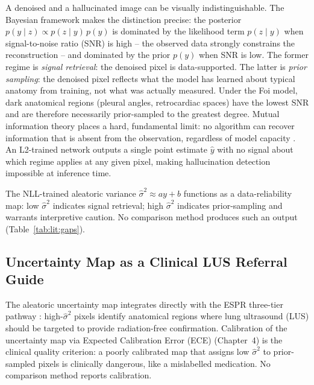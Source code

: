 \documentclass[12pt, a4paper, twoside, openright]{book}
\begin{document}
A denoised and a hallucinated image can be visually indistinguishable. The Bayesian framework makes the distinction precise: the posterior $p(y \mid z) \propto p(z \mid y)\,p(y)$ is dominated by the likelihood term $p(z \mid y)$ when signal-to-noise ratio (SNR) is high -- the observed data strongly constrains the reconstruction -- and dominated by the prior $p(y)$ when SNR is low. The former regime is \emph{signal retrieval}: the denoised pixel is data-supported. The latter is \emph{prior sampling}: the denoised pixel reflects what the model has learned about typical anatomy from training, not what was actually measured. Under the Foi model, dark anatomical regions (pleural angles, retrocardiac spaces) have the lowest SNR and are therefore necessarily prior-sampled to the greatest degree. Mutual information theory places a hard, fundamental limit: no algorithm can recover information that is absent from the observation, regardless of model capacity \cite{lucas_dont_2019}. An L2-trained network outputs a single point estimate $\hat{y}$ with no signal about which regime applies at any given pixel, making hallucination detection impossible at inference time.

The NLL-trained aleatoric variance $\hat{\sigma}^2 \approx ay+b$ \cite{foi_practical_2008, kendall_what_2017} functions as a data-reliability map: low $\hat{\sigma}^2$ indicates signal retrieval; high $\hat{\sigma}^2$ indicates prior-sampling and warrants interpretive caution. No comparison method produces such an output (Table~\ref{tab:lit:gaps}).

\subsection{Uncertainty Map as a Clinical LUS Referral Guide}
\label{sec:lit:uncertainty:workflow}

The aleatoric uncertainty map integrates directly with the ESPR three-tier pathway \cite{lovrenski_esr_2025}: high-$\hat{\sigma}^2$ pixels identify anatomical regions where lung ultrasound (LUS) should be targeted to provide radiation-free confirmation. Calibration of the uncertainty map via Expected Calibration Error (ECE) (Chapter~4) is the clinical quality criterion: a poorly calibrated map that assigns low $\hat{\sigma}^2$ to prior-sampled pixels is clinically dangerous, like a mislabelled medication. No comparison method reports calibration.
\end{document}
